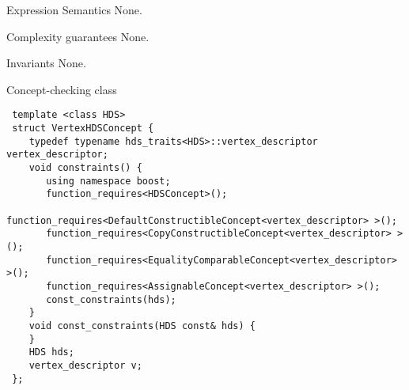 \begin{Desc}
\item[Expression Semantics]None.\end{Desc}
\begin{Desc}
\item[Complexity guarantees]None.\end{Desc}
\begin{Desc}
\item[Invariants]None.\end{Desc}
\begin{Desc}
\item[Concept-checking class]

\begin{Code}\begin{verbatim} template <class HDS> 
 struct VertexHDSConcept {
    typedef typename hds_traits<HDS>::vertex_descriptor vertex_descriptor; 
    void constraints() {
       using namespace boost;
       function_requires<HDSConcept>();
       function_requires<DefaultConstructibleConcept<vertex_descriptor> >();
       function_requires<CopyConstructibleConcept<vertex_descriptor> >();
       function_requires<EqualityComparableConcept<vertex_descriptor> >();
       function_requires<AssignableConcept<vertex_descriptor> >();
       const_constraints(hds);
    }
    void const_constraints(HDS const& hds) {
    }
    HDS hds;
    vertex_descriptor v;
 };
\end{verbatim}\end{Code}

 \end{Desc}
